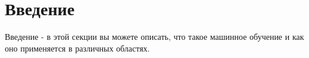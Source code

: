 

\section{Введение}\label{sec:introduction}

        Введение - в этой секции вы можете описать, что такое машинное обучение и как оно применяется в различных областях.

